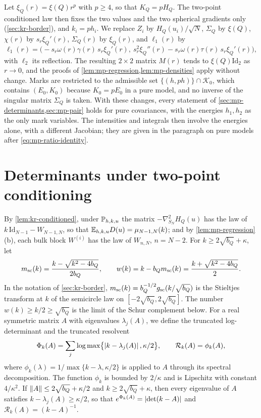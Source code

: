 \begin{remark}\label{rem:mp-pure}
Let $\xi_Q(r)=\xi(Q)r^p$ with $p\ge4$, so that $K_Q=pH_Q$. The two-point conditioned law then fixes the two values and the two spherical gradients only (\cref{sec:kr-border}), and $k_i=ph_i$. We replace $Z_i$ by $H_Q(u_i)/\sqrt N$, $\Sigma_Q$ by $\xi(Q)$, $\chi(r)$ by $s_r\xi_Q'(r)$, $\Sigma_Q(r)$ by $\xi_Q(r)$, and $\ell_1(r)$ by
\[
\ell_1(r)=\bigl(-s_r\omega(r)\gamma(r)\,s_r\xi_Q'(r),\ s_r^2\xi_Q''(r)-s_r\omega(r)\tau(r)\,s_r\xi_Q'(r)\bigr),
\]
with $\ell_2$ its reflection. The resulting $2\times2$ matrix $M(r)$ tends to $\xi(Q)\mathrm{Id}_2$ as $r\to0$, and the proofs of \cref{lem:mp-regression,lem:mp-densities} apply without change. Marks are restricted to the admissible set $\{(h,ph)\}\cap\mathcal K_0$, which contains $(E_0,K_0)$ because $K_0=pE_0$ in a pure model, and no inverse of the singular matrix $\Sigma_Q$ is taken. With these changes, every statement of \cref{sec:mp-determinants,sec:mp-pair} holds for pure covariances, with the energies $h_1,h_2$ as the only mark variables. The intensities and integrals then involve the energies alone, with a different Jacobian; they are given in the paragraph on pure models after \eqref{eq:mp-ratio-identity}.
\end{remark}


\section{Determinants under two-point conditioning}\label{sec:mp-determinants}

By \cref{lem:kr-conditioned}, under $\mathbb P_{h,k,u}$ the matrix $-\nabla^2_{S_N}H_Q(u)$ has the law of $k\,\mathrm{Id}_{N-1}-W_{N-1,N}$, so that $\mathbb E_{h,k,u}D(u)=\mu_{N-1,N}(k)$; and by \cref{lem:mp-regression}(b), each bulk block $W^{(i)}$ has the law of $W_{n,N}$, $n=N-2$. For $k\ge2\sqrt{b_Q}+\kappa$, let
\begin{equation}\label{eq:mp-msc}
m_{\rm sc}(k)=\frac{k-\sqrt{k^2-4b_Q}}{2b_Q},\qquad w(k)=k-b_Qm_{\rm sc}(k)=\frac{k+\sqrt{k^2-4b_Q}}2.
\end{equation}
In the notation of \cref{sec:kr-border}, $m_{\rm sc}(k)=b_Q^{-1/2}g_{\rm sc}(k/\sqrt{b_Q})$ is the Stieltjes transform at $k$ of the semicircle law on $[-2\sqrt{b_Q},2\sqrt{b_Q}]$. The number $w(k)\ge k/2\ge\sqrt{b_Q}$ is the limit of the Schur complement below. For a real symmetric matrix $A$ with eigenvalues $\lambda_j(A)$, we define the truncated log-determinant and the truncated resolvent
\begin{equation}\label{eq:mp-clipped}
\Phi_k(A)=\sum_j\log\max\bigl\{\left|k-\lambda_j(A)\right|,\kappa/2\bigr\},\qquad \mathcal R_k(A)=\phi_k(A),
\end{equation}
where $\phi_k(\lambda)=1/\max\{k-\lambda,\kappa/2\}$ is applied to $A$ through its spectral decomposition. The function $\phi_k$ is bounded by $2/\kappa$ and is Lipschitz with constant $4/\kappa^2$. If $\left\lVert A\right\rVert\le2\sqrt{b_Q}+\kappa/2$ and $k\ge2\sqrt{b_Q}+\kappa$, then every eigenvalue of $A$ satisfies $k-\lambda_j(A)\ge\kappa/2$, so that $e^{\Phi_k(A)}=\left|\det(k-A)\right|$ and $\mathcal R_k(A)=(k-A)^{-1}$.

